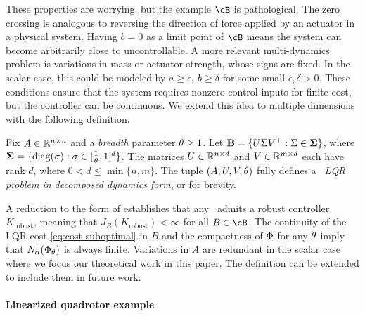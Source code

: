 These properties are worrying, but the example $\cB$ is pathological.
The zero crossing is analogous to reversing the direction of force applied by an actuator in a physical system.
Having $b = 0$ as a limit point of $\cB$ means the system can become arbitrarily close to uncontrollable.
A more relevant multi-dynamics problem is variations
in mass or actuator strength,
whose signs are fixed.
In the scalar case, this could be modeled by
$a \geq \epsilon,\ b \geq \delta$ for some small $\epsilon, \delta > 0$.
These conditions ensure that the system requires nonzero control inputs for finite cost,
but the controller can be continuous. %
We extend this idea to multiple dimensions with the following definition.
\begin{definition}%
\label{def:B-SVD}
	Fix $A \in \mathbb{R}^{n \times n}$
	and a \emph{breadth} parameter $\theta \geq 1$.
	Let
		$\mathbf{B} = \{ U \Sigma V^\top : \Sigma \in \boldsymbol\Sigma \}$,
		where
		$\boldsymbol\Sigma = \{ \operatorname{diag}(\sigma) : \sigma \in [\frac{1}{\theta}, 1]^d \}$.
	The matrices $U \in \mathbb{R}^{n \times d}$
	and
	$V \in \mathbb{R}^{m \times d}$ each have rank $d$, where
	$0 < d \leq \min \{n, m\}$.
	The tuple $(A, U, V, \theta)$
	fully defines a \emph{\multienv\ LQR problem in decomposed dynamics form},
	or \emph{\DDFproblem} for brevity.
\end{definition}

A reduction to the form of
\citet{thorp-matchingconditions}
establishes that any \DDFproblem\
admits a robust controller
$K_{\mathrm{robust}}$,
meaning that $J_B(K_{\mathrm{robust}}) < \infty$
for all $B \in \cB$.
The continuity of the LQR cost \eqref{eq:cost-suboptimal} in $B$
and the compactness of $\Phi$ for any $\theta$ imply that
$N_{\alpha}(\Phi_\theta)$ is always finite.
Variations in $A$ are redundant in the scalar case where we focus our theoretical work in this paper.
The definition can be extended to include them in future work.




\paragraph{Linearized quadrotor example}

